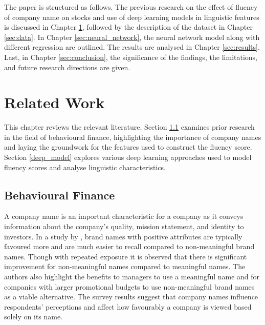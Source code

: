\documentclass[a4paper,11pt]{report}
\begin{document}
The paper is structured as follows. The previous research on the effect of fluency of company name on stocks and use of deep learning models in linguistic features is discussed in Chapter \ref{sec:lit}, followed by the description of the dataset in Chapter \ref{sec:data}. In Chapter \ref{sec:neural_network}, the neural network model along with different regression are outlined. The results are analysed in Chapter \ref{sec:results}. Last, in Chapter \ref{sec:conclusion}, the significance of the findings, the limitations, and future research directions are given. 

\chapter{Related Work} \label{sec:lit}
This chapter reviews the relevant literature. Section \ref{Behave} examines prior research in the field of behavioural finance, highlighting the importance of company names and laying the groundwork for the features used to construct the fluency score. Section \ref{deep_model} explores various deep learning approaches used to model fluency scores and analyse linguistic characteristics.

\section{Behavioural Finance} \label{Behave}
A company name is an important characteristic for a company as it conveys information about the company's quality, mission statement, and identity to investors. In a study by , brand names with positive attributes are typically favoured more and are much easier to recall compared to non-meaningful brand names. Though with repeated exposure it is observed that there is significant improvement for non-meaningful names compared to meaningful names. The authors also highlight the benefits to managers to use a meaningful name and for companies with larger promotional budgets to use non-meaningful brand names as a viable alternative. The survey results suggest that company names influence respondents' perceptions and affect how favourably a company is viewed based solely on its name.
\end{document}
